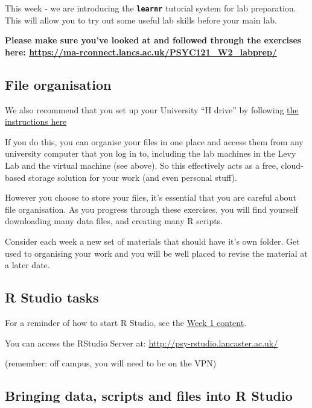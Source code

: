 \documentclass[
]{book}
\begin{document}
This week - we are introducing the \textbf{\texttt{learnr}} tutorial system for lab preparation. This will allow you to try out some useful lab skills before your main lab.

\textbf{Please make sure you've looked at and followed through the exercises here: \url{https://ma-rconnect.lancs.ac.uk/PSYC121_W2_labprep/}}

\hypertarget{file-organisation}{%
\subsection{File organisation}\label{file-organisation}}

We also recommend that you set up your University ``H drive'' by following \href{https://answers.lancaster.ac.uk/display/ISS/Personal+filestore+\%28H+drive\%29+help}{the instructions here}

If you do this, you can organise your files in one place and access them from any university computer that you log in to, including the lab machines in the Levy Lab and the virtual machine (see above). So this effectively acts as a free, cloud-based storage solution for your work (and even personal stuff).

However you choose to store your files, it's essential that you are careful about file organisation. As you progress through these exercises, you will find yourself downloading many data files, and creating many R scripts.

Consider each week a new set of materials that should have it's own folder. Get used to organising your work and you will be well placed to revise the material at a later date.

\hypertarget{r-studio-tasks}{%
\subsection{R Studio tasks}\label{r-studio-tasks}}

For a reminder of how to start R Studio, see the \protect\hyperlink{getting_started}{Week 1 content}.

You can access the RStudio Server at: \url{http://psy-rstudio.lancaster.ac.uk/}

(remember: off campus, you will need to be on the VPN)

\hypertarget{bringing-data-scripts-and-files-into-r-studio}{%
\subsection{Bringing data, scripts and files into R Studio}\label{bringing-data-scripts-and-files-into-r-studio}}
\end{document}

